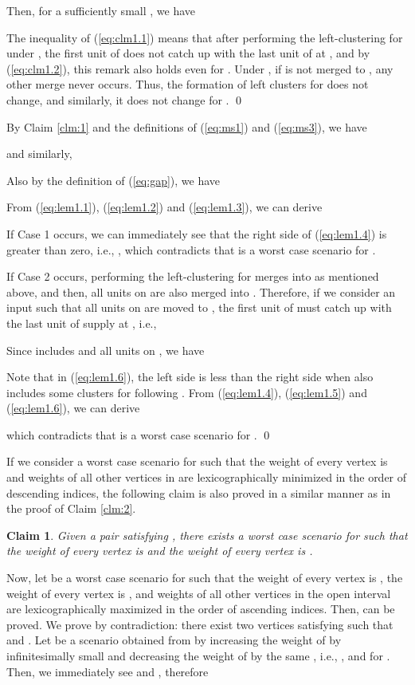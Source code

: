\documentclass[a4paper]{llncs}
\newtheorem{clm}{Claim}
\begin{document}
Then, for a sufficiently small , we have

The inequality of (\ref{eq:clm1.1}) means that after performing the left-clustering for  under , the first unit of  does not catch up with the last unit of  at ,
and by (\ref{eq:clm1.2}), this remark also holds even for . 
Under , if  is not merged to , any other merge never occurs.
Thus, the formation of left clusters for  does not change,
and similarly, it does not change for . 
\qed


\medskip

By Claim \ref{clm:1} and the definitions of (\ref{eq:ms1}) and (\ref{eq:ms3}), we have 

and similarly, 

Also by the definition of (\ref{eq:gap}), we have

From (\ref{eq:lem1.1}), (\ref{eq:lem1.2}) and (\ref{eq:lem1.3}), we can derive 


If Case 1 occurs, 
we can immediately see that the right side of (\ref{eq:lem1.4}) is greater than zero, i.e., ,
which contradicts that  is a worst case scenario for .

If Case 2 occurs, 
performing the left-clustering for  merges  into  as mentioned above,
and then, all units on  are also merged into .
Therefore, if we consider an input such that all units on  are moved to ,
the first unit of  must catch up with the last unit of supply at ,
i.e.,

Since  includes  and all units on , we have

Note that in (\ref{eq:lem1.6}), the left side is less than the right side when  also includes some clusters for  following .
From (\ref{eq:lem1.4}), (\ref{eq:lem1.5}) and (\ref{eq:lem1.6}), we can derive 

which contradicts that  is a worst case scenario for .
\qed


\medskip

If we consider a worst case scenario for  such that the weight of every vertex  is  and weights of all other vertices in  are lexicographically minimized in the order of descending indices,
the following claim is also proved in a similar manner as in the proof of Claim \ref{clm:2}.
\begin{clm}
Given a pair  satisfying ,
there exists a worst case scenario for  such that 
the weight of every vertex  is  and 
the weight of every vertex  is .
\label{clm:3}
\end{clm}

Now, let  be a worst case scenario for  such that the weight of every vertex  is , 
the weight of every vertex  is , and
weights of all other vertices in the open interval  are lexicographically maximized in the order of ascending indices.
Then,  can be proved.
We prove by contradiction: there exist two vertices  satisfying  such that  and .
Let  be a scenario obtained from  by increasing the weight of  by infinitesimally small  and
decreasing the weight of  by the same , 
i.e., ,  and  for .
Then, we immediately see  and , therefore
\end{document}

